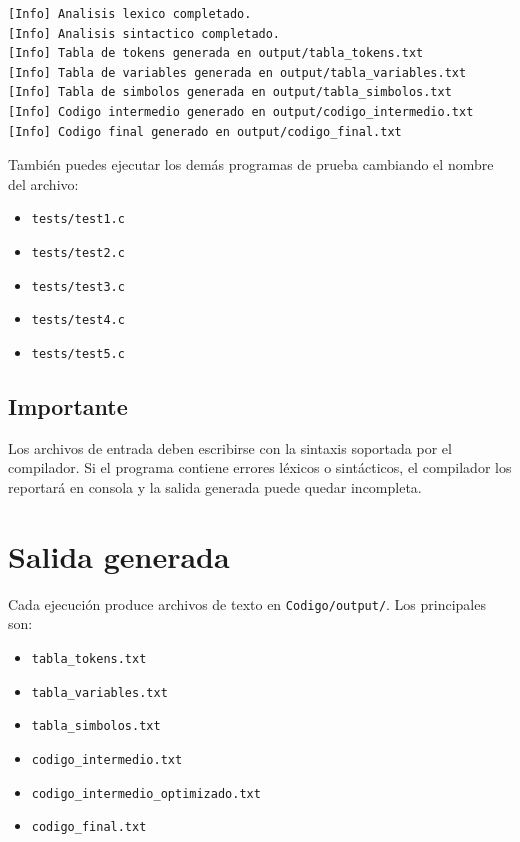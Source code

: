 \documentclass[12pt]{article}
\begin{document}
\begin{lstlisting}[language={}, caption={Salida normal en terminal}]
[Info] Analisis lexico completado.
[Info] Analisis sintactico completado.
[Info] Tabla de tokens generada en output/tabla_tokens.txt
[Info] Tabla de variables generada en output/tabla_variables.txt
[Info] Tabla de simbolos generada en output/tabla_simbolos.txt
[Info] Codigo intermedio generado en output/codigo_intermedio.txt
[Info] Codigo final generado en output/codigo_final.txt
\end{lstlisting}

También puedes ejecutar los demás programas de prueba cambiando el nombre del archivo:
\begin{itemize}[label={-}]
    \item \texttt{tests/test1.c}
    \item \texttt{tests/test2.c}
    \item \texttt{tests/test3.c}
    \item \texttt{tests/test4.c}
    \item \texttt{tests/test5.c}
\end{itemize}

\subsection{Importante}
Los archivos de entrada deben escribirse con la sintaxis soportada por el compilador. Si el programa contiene errores léxicos o sintácticos, el compilador los reportará en consola y la salida generada puede quedar incompleta.

\section{Salida generada}
Cada ejecución produce archivos de texto en \texttt{Codigo/output/}. Los principales son:
\begin{itemize}[label={-}]
    \item \texttt{tabla\_tokens.txt}
    \item \texttt{tabla\_variables.txt}
    \item \texttt{tabla\_simbolos.txt}
    \item \texttt{codigo\_intermedio.txt}
    \item \texttt{codigo\_intermedio\_optimizado.txt}
    \item \texttt{codigo\_final.txt}
\end{itemize}
\end{document}
